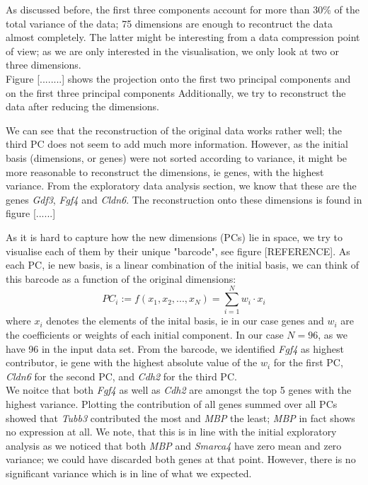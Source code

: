 \documentclass[journal, a4paper]{IEEEtran}
\begin{document}
As discussed before, the first three components account for more than 30\% of the total variance of the data; 75 dimensions are enough to recontruct the data almost completely. The latter might be interesting from a data compression point of view; as we are only interested in the visualisation, we only look at two or three dimensions.\\

Figure [........] shows the projection onto the first two principal components and on the first three principal components 
Additionally, we try to reconstruct the data after reducing the dimensions. 

We can see that the reconstruction of the original data works rather well; the third PC does not seem to add much more information.
However, as the initial basis (dimensions, or genes) were not sorted according to variance, it might be more reasonable to reconstruct the dimensions, ie genes, with the highest variance. From the exploratory data analysis section, we know that these are the genes \textit{Gdf3}, \textit{Fgf4} and \textit{Cldn6}. The reconstruction onto these dimensions is found in figure [......]

As it is hard to capture how the new dimensions (PCs) lie in space, we try to visualise each of them by their unique "barcode", see figure [REFERENCE]. As each PC, ie new basis, is a linear combination of the initial basis, we can think of this barcode as a function of the original dimensions:
\begin{equation}
	PC_{i}  := f(x_{1}, x_{2}, ..., x_{N}) = \sum_{i=1}^{N} w_{i} \cdot x_{i}
\end{equation}
where \( x_{i} \) denotes the elements of the inital basis, ie in our case genes and \( w_{i} \) are the coefficients or weights of each initial component. In our case \( N = 96 \), as we have 96 in the input data set. From the barcode, we identified \textit{Fgf4} as highest contributor, ie gene with the highest absolute value of the \( w_{i} \) for the first PC, \textit{Cldn6} for the second PC, and \textit{Cdh2} for the third PC. \\
We noitce that both \textit{Fgf4} as well as \textit{Cdh2} are amongst the top 5 genes with the highest variance. 
Plotting the contribution of all genes summed over all PCs showed that \textit{Tubb3} contributed the most and \textit{MBP} the least; \textit{MBP} in fact shows no expression at all. We note, that this is in line with the initial exploratory analysis as we noticed that both \textit{MBP} and \textit{Smarca4} have zero mean and zero variance; we could have discarded both genes at that point.
However, there is no significant variance which is in line of what we expected.
\end{document}
